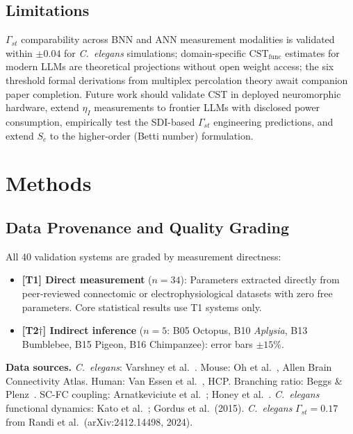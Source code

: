 \documentclass[12pt]{article}
\newcommand{\CST}{\mathrm{CST}}
\newcommand{\Sc}{S_c}
\newcommand{\Gst}{\Gamma_{st}}
\newcommand{\etaI}{\eta_I}
\begin{document}
\subsection{Limitations}

$\Gst$ comparability across BNN and ANN measurement modalities is validated within $\pm 0.04$ for \textit{C.\ elegans} simulations; domain-specific $\CST_{\mathrm{func}}$ estimates for modern LLMs are theoretical projections without open weight access; the six threshold formal derivations from multiplex percolation theory await companion paper completion. Future work should validate CST in deployed neuromorphic hardware, extend $\etaI$ measurements to frontier LLMs with disclosed power consumption, empirically test the SDI-based $\Gst$ engineering predictions, and extend $\Sc$ to the higher-order (Betti number) formulation.

\section{Methods}

\subsection{Data Provenance and Quality Grading}

All 40 validation systems are graded by measurement directness:
\begin{itemize}
\item \textbf{[T1] Direct measurement} ($n=34$): Parameters extracted directly from peer-reviewed connectomic or electrophysiological datasets with zero free parameters. Core statistical results use T1 systems only.
\item \textbf{[T2$\dagger$] Indirect inference} ($n=5$: B05 Octopus, B10 \textit{Aplysia}, B13 Bumblebee, B15 Pigeon, B16 Chimpanzee): error bars $\pm 15\%$.
\end{itemize}

\textbf{Data sources.} \textit{C.\ elegans}: Varshney et al.~\cite{varshney2011}. Mouse: Oh et al.~\cite{oh2014}, Allen Brain Connectivity Atlas. Human: Van Essen et al.~\cite{vanessen2013}, HCP. Branching ratio: Beggs \& Plenz~\cite{beggs2003}. SC-FC coupling: Arnatkeviciute et al.~\cite{arnatkeviciute2021}; Honey et al.~\cite{honey2009}. \textit{C.\ elegans} functional dynamics: Kato et al.~\cite{kato2015}; Gordus et al.\ (2015). \textit{C.\ elegans} $\Gst = 0.17$ from Randi et al.\ (arXiv:2412.14498, 2024).
\end{document}
